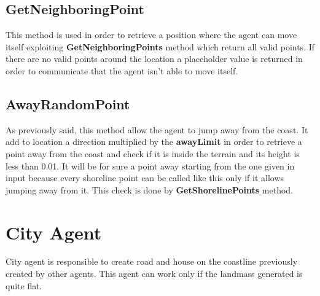\documentclass[12pt]{article}
\begin{document}
    \subsection{GetNeighboringPoint}
    This method is used in order to retrieve a position where the agent can move itself exploiting \textbf{GetNeighboringPoints} method which return all
    valid points. If there are no valid points around the location a placeholder value is returned in order to communicate that the agent isn't able
    to move itself.

    \subsection{AwayRandomPoint}
    As previously said, this method allow the agent to jump away from the coast. It add to location a direction multiplied by the \textbf{awayLimit} in order
    to retrieve a point away from the coast and check if it is inside the terrain and its height is less than 0.01. It will be for sure a point away starting
    from the one given in input because every shoreline point can be called like this only if it allows jumping away from it. This check is done by 
    \textbf{GetShorelinePoints} method.

    \section{City Agent}
    City agent is responsible to create road and house on the coastline previously created by other agents. This agent can work only if the landmass generated
    is quite flat. 
\end{document}
